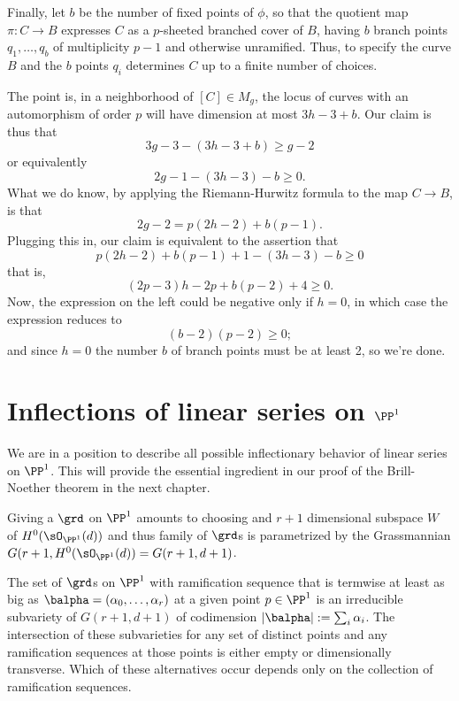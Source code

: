 Finally, let $b$ be the number of fixed points of $\phi$, so that the quotient map $\pi : C \to B$ expresses $C$ as a $p$-sheeted branched cover of $B$, having $b$ branch points $q_1,\dots, q_b$ of multiplicity $p-1$ and otherwise unramified. Thus, to specify the curve $B$ and the $b$ points $q_i$ determines $C$ up to a finite number of choices. 

The point is, in a neighborhood of $[C] \in M_g$, the locus of curves with an automorphism of order $p$ will have dimension at most $3h-3 + b$. Our claim is thus that
$$
3g-3 - (3h-3+b) \geq g-2
$$
or equivalently
$$
2g - 1 - (3h-3) - b \geq 0.
$$
What we do know, by applying the Riemann-Hurwitz formula to the map $C \to B$, is that
$$
2g-2 = p(2h-2) + b(p-1).
$$
Plugging this in, our claim is equivalent to the assertion that
$$
p(2h-2) + b(p-1) + 1 - (3h-3) - b \geq 0
$$
that is,
$$
(2p-3)h -2p + b(p-2) + 4 \geq 0.
$$
Now, the expression on the left could be negative only if $h=0$, in which case the expression reduces to
$$
(b-2)(p-2) \geq 0;
$$
and since $h=0$ the number $b$ of branch points must be at least 2, so we're done.

\section{Inflections of linear series on $\PP^1$}

We are in a position to describe all possible inflectionary behavior of linear series on $\PP^1$. This will provide the essential ingredient in our proof of the Brill-Noether theorem in the next chapter.


Giving a $\grd$ on $\PP^{1}$ amounts to choosing and $r+1$ dimensional subspace $W$ of  $H^{0}(\sO_{\PP^{1}}(d))$ and thus family of $\grd$s is parametrized by the
Grassmannian $G(r+1, H^{0}(\sO_{\PP^{1}}(d)) = G(r+1, d+1)$.

\goodbreak

\begin{theorem}\label{transversality of ramification}
The set of $\grd$s on $\PP^{1}$  with ramification sequence that is termwise at least as big as $\balpha = (\alpha_{0}, \dots, \alpha_{r})$ 
at a
given point $p\in \PP^{1}$
is an irreducible subvariety of $G(r+1,d+1)$ of codimension $|\balpha| := \sum_{i}\alpha_{i}$. The intersection
of these subvarieties for any set of distinct points and any ramification sequences at those points
is either empty or dimensionally transverse. Which of these alternatives occur depends
only on the collection of ramification sequences.
\end{theorem}

